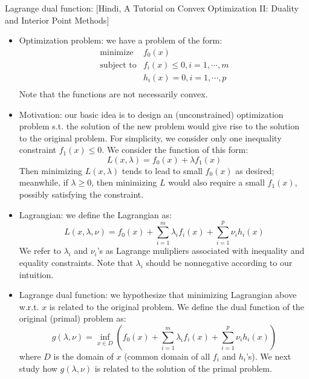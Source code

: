 \documentclass{report}
\begin{document}
Lagrange dual function: [Hindi, A Tutorial on Convex Optimization II: Duality and Interior Point Methods]
\begin{itemize}
\item Optimization problem: we have a problem of the form:
\begin{equation}
\begin{array}{ll}
\text{minimize} & f_0(x) \\
\text{subject to} & f_i(x) \leq 0, i = 1, \cdots, m\\
 & h_i(x) = 0, i = 1, \cdots, p\\
\end{array}
\end{equation}
Note that the functions are not necessarily convex.

\item Motivation: our basic idea is to design an (unconstrained) optimization problem s.t. the solution of the new problem would give rise to the solution to the original problem. For simplicity, we consider only one inequality constraint $f_1(x) \leq 0$. We consider the function of this form: 
\begin{equation}
L(x,\lambda) = f_0(x) + \lambda f_1(x)	
\end{equation}
Then minimizing $L(x,\lambda)$ tends to lead to small $f_0(x)$ as desired; meanwhile, if $\lambda \geq 0$, then minimizing $L$ would also require a small $f_1(x)$, possibly satisfying the constraint. 

\item Lagrangian: we define the Lagrangian as: 
\begin{equation}
L(x,\lambda,\nu) = f_0(x) + \sum_{i=1}^m \lambda_i f_i(x) + \sum_{i=1}^p \nu_i h_i(x)
\end{equation}
We refer to $\lambda_i$ and $\nu_i$'s as Lagrange mulipliers associated with inequality and equality constraints. Note that $\lambda_i$ should be nonnegative according to our intuition. 

\item Lagrange dual function: we hypothesize that minimizing Lagrangian above w.r.t. $x$ is related to the original problem. We define the dual function of the original (primal) problem as: 
\begin{equation}
g(\lambda, \nu) = \inf_{x \in D} \left( f_0(x) + \sum_{i=1}^m \lambda_i f_i(x) + \sum_{i=1}^p \nu_i h_i(x) \right)	
\end{equation}
where $D$ is the domain of $x$ (common domain of all $f_i$ and $h_i$'s). We next study how $g(\lambda,\nu)$ is related to the solution of the primal problem. 

\end{itemize}
\end{document}

